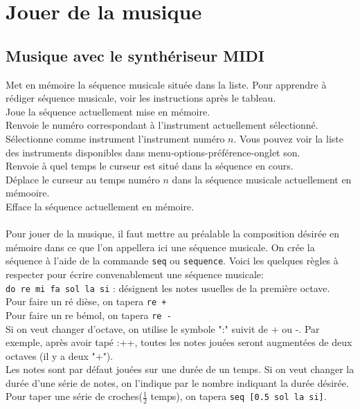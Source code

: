\section{Jouer de la musique}
\subsection{Musique avec le synthériseur MIDI}
\noindent
{}
Met en mémoire la séquence musicale située dans la liste. Pour apprendre à rédiger séquence musicale, voir les instructions après le tableau.\\
Joue la séquence actuellement mise en mémoire. \\
Renvoie le numéro correspondant à l'instrument actuellement sélectionné. \\
Sélectionne comme instrument l'instrument numéro $n$. Vous pouvez voir la liste des instruments disponibles dans menu-options-préférence-onglet son.\\
Renvoie à quel temps le curseur est situé dans la séquence en cours.\\
Déplace le curseur au temps numéro $n$ dans la séquence musicale actuellement en mémooire.\\
Efface la séquence actuellement en mémoire. \\ \\
Pour jouer de la musique, il faut mettre au préalable la composition désirée en mémoire dans ce que l'on appellera ici une séquence musicale. On crée la séquence à l'aide de la commande \texttt{seq} ou \texttt{sequence}. Voici les quelques règles à respecter pour écrire convenablement une séquence musicale:\\
\texttt{do re mi fa sol la si} : désignent les notes usuelles de la première octave.\\
Pour faire un ré dièse, on tapera \texttt{re +}\\
Pour faire un re bémol, on tapera \texttt{re -}\\
Si on veut changer d'octave, on utilise le symbole ":" suivit de + ou -. Par exemple, après avoir tapé :++, toutes les notes jouées seront augmentées de deux octaves (il y a deux "+"). \\
Les notes sont par défaut jouées sur une durée de un temps. Si on veut changer la durée d'une série de notes, on l'indique par le nombre indiquant la durée désirée. Pour taper une série de croches($\frac{1}{2}$ temps), on tapera \texttt{seq [0.5 sol la si]}.\\
